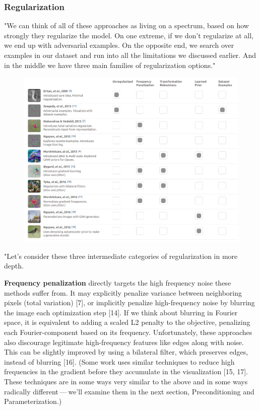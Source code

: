 \documentclass[]{scrartcl}
\begin{document}
\subsubsection{Regularization}
"We can think of all of these approaches as living on a spectrum, based on how strongly they regularize the model. On one extreme, if we don’t regularize at all, we end up with adversarial examples. On the opposite end, we search over examples in our dataset and run into all the limitations we discussed earlier. And in the middle we have three main families of regularization options." \cite{Olah2017}
\begin{figure}[h]
	\centering
	\includegraphics[width=1\linewidth]{regularization}
\end{figure}
"Let’s consider these three intermediate categories of regularization in more depth.

\textbf{Frequency penalization} directly targets the high frequency noise these methods suffer from. It may explicitly penalize variance between neighboring pixels (total variation) [7], or implicitly penalize high-frequency noise by blurring the image each optimization step [14]. If we think about blurring in Fourier space, it is equivalent to adding a scaled L2 penalty to the objective, penalizing each Fourier-component based on its frequency. Unfortunately, these approaches also discourage legitimate high-frequency features like edges along with noise. This can be slightly improved by using a bilateral ﬁlter, which preserves edges, instead of blurring [16].
(Some work uses similar techniques to reduce high frequencies in the gradient before they accumulate in the visualization [15, 17]. These techniques are in some ways very similar to the above and in some ways radically different --- we’ll examine them in the next section, Preconditioning and Parameterization.)
\end{document}
